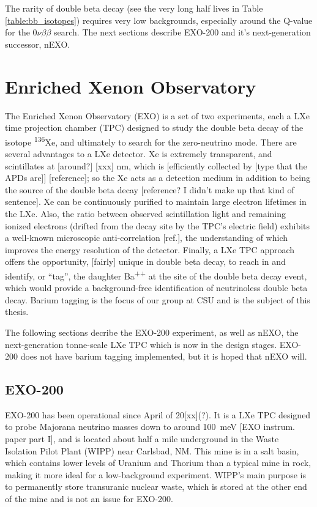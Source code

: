 The rarity of double beta decay (see the very long half lives in Table \ref{table:bb_isotopes}) requires very low backgrounds, especially around the Q-value for the $0\nu\beta\beta$ search. The next sections describe EXO-200 and it's next-generation successor, nEXO.

\section{Enriched Xenon Observatory}

The Enriched Xenon Observatory (EXO) is a set of two experiments, each a LXe time projection chamber (TPC) designed to study the double beta decay of the isotope \textsuperscript{136}Xe, and ultimately to search for the zero-neutrino mode.  There are several advantages to a LXe detector.  Xe is extremely transparent, and scintillates at [around?] [xxx] nm, which is [efficiently collected by [type that the APDs are]] [reference]; so the Xe acts as a detection medium in addition to being the source of the double beta decay [reference? I didn't make up that kind of sentence].  Xe can be continuously purified to maintain large electron lifetimes in the LXe.  Also, the ratio between observed scintillation light and remaining ionized electrons (drifted from the decay site by the TPC's electric field) exhibits a well-known microscopic anti-correlation [ref.], the understanding of which improves the energy resolution of the detector.  Finally, a LXe TPC approach offers the opportunity, [fairly] unique in double beta decay, to reach in and identify, or ``tag'', the daughter Ba\textsuperscript{++} at the site of the double beta decay event, which would provide a background-free identification of neutrinoless double beta decay. Barium tagging is the focus of our group at CSU and is the subject of this thesis.

The following sections decribe the EXO-200 experiment, as well as nEXO, the next-generation tonne-scale LXe TPC which is now in the design stages.  EXO-200 does not have barium tagging implemented, but it is hoped that nEXO will. 

\subsection{EXO-200}

EXO-200 has been operational since April of 20[xx](?).  It is a LXe TPC designed to probe Majorana neutrino masses down to around 100~meV [EXO instrum. paper part I], and is located about half a mile underground in the Waste Isolation Pilot Plant (WIPP) near Carlsbad, NM.  This mine is in a salt basin, which contains lower levels of Uranium and Thorium than a typical mine in rock, making it more ideal for a low-background experiment.  WIPP's main purpose is to permanently store transuranic nuclear waste, which is stored at the other end of the mine and is not an issue for EXO-200.

